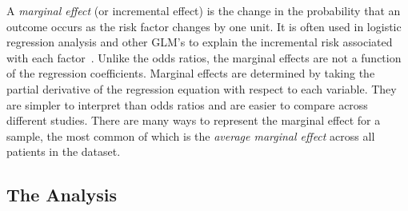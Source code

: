 A \emph{marginal effect} (or incremental effect) is the change in the probability that an outcome occurs as the risk factor changes by one unit.
It is often used in logistic regression analysis and other GLM's to explain the incremental risk associated with each factor~\citep{Marginal-Effects--Quantifying-the-Effect-of-Changes-in-Risk-Factors-in-Logistic-Regression-Models}. 
Unlike the odds ratios, the marginal effects are not a function of the regression coefficients.
Marginal effects are determined by taking the partial derivative of the regression equation with respect to each variable.
They are simpler to interpret than odds ratios and are easier to compare across different studies.
There are many ways to represent the marginal effect for a sample, the most common of which is the \emph{average marginal effect} across all patients in the dataset.

\subsection{The Analysis}\label{subsec:analysis}



